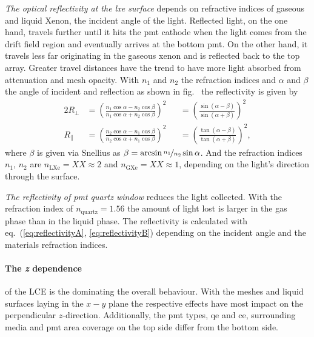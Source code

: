 \emph{The optical reflectivity at the \gls{lxe} surface} depends on refractive indices of gaseous and liquid Xenon, the incident angle of the light.
Reflected light, on the one hand, travels further until it hits the \gls{pmt} cathode when the light comes from the drift field region and eventually arrives at the bottom \gls{pmt}.
On the other hand, it travels less far originating in the gaseous xenon and is reflected back to the top array.
Greater travel distances have the trend to have more light absorbed from attenuation and mesh opacity.
With $ n_1 $ and $ n_2 $ the refraction indices and $ \alpha $ and $ \beta $ the angle of incident and reflection as shown in fig.~%
the reflectivity is given by
\begin{alignat}{2}
    \label{eq:reflectivityA}
    R_\perp &= \left( \frac{ n_1 \cos{\alpha} - n_2 \cos{\beta} }{ n_1 \cos{\alpha} + n_2 \cos{\beta} } \right)^2 &
            &=  \left( \frac{ \sin{\left( \alpha-\beta \right)}}{ \sin{\left( \alpha+\beta \right)} } \right)^2 \\
    R_\parallel &= \left( \frac{ n_2 \cos{\alpha} - n_1 \cos{\beta} }{ n_2 \cos{\alpha} + n_1 \cos{\beta} } \right)^2 &
                &=  \left( \frac{ \tan{\left( \alpha-\beta \right)}}{ \tan{\left( \alpha+\beta \right)} } \right)^2,
    \label{eq:reflectivityB}
\end{alignat}
where $ \beta $ is given via Snellius as $ \beta = \arcsin{\nicefrac{n_1}{n_2} \sin{\alpha} } $.
And the refraction indices $ n_1 $, $ n_2 $ are $ n_\mathrm{LXe} = XX \approx 2 $ and $ n_\mathrm{GXe} = XX \approx 1 $, depending on the light's direction through the surface.


\emph{The reflectivity of \gls{pmt} quartz window} reduces the light collected. With the refraction index of $ n_\mathrm{quartz} = 1.56 $ the amount of light lost is larger in the gas phase than in the liquid phase. The reflectivity is calculated with eq.~(\ref{eq:reflectivityA}, \ref{eq:reflectivityB}) depending on the incident angle and the materials refraction indices.


\paragraph{The \emph{z} dependence} of the \gls{LCE} is the dominating the overall behaviour.
With the meshes and liquid surfaces laying in the $ x-y $ plane the respective effects have most impact on the perpendicular $ z $-direction.
Additionally, the \gls{pmt} types, \gls{qe} and \gls{ce}, surrounding media and \gls{pmt} area coverage on the top side differ from the bottom side.














